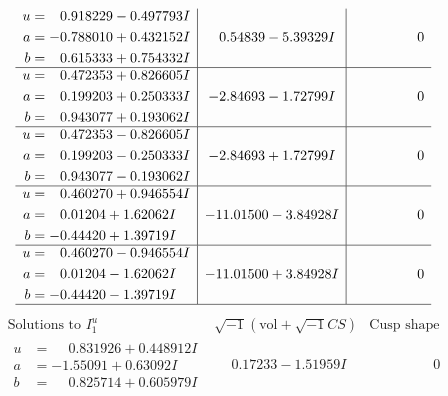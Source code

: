 \documentclass[1p]{elsarticle_modified}
\theoremstyle{definition}
\newcommand{\I}{\sqrt{-1}}
\begin{document}
$$\begin{array}{c|c|c}
\begin{aligned}
u &= \phantom{-}0.918229 - 0.497793 I \\
a &= -0.788010 + 0.432152 I \\
b &= \phantom{-}0.615333 + 0.754332 I\end{aligned}
 & \phantom{-}0.54839 - 5.39329 I & \phantom{-0.000000 } 0 \\ \hline\begin{aligned}
u &= \phantom{-}0.472353 + 0.826605 I \\
a &= \phantom{-}0.199203 + 0.250333 I \\
b &= \phantom{-}0.943077 + 0.193062 I\end{aligned}
 & -2.84693 - 1.72799 I & \phantom{-0.000000 } 0 \\ \hline\begin{aligned}
u &= \phantom{-}0.472353 - 0.826605 I \\
a &= \phantom{-}0.199203 - 0.250333 I \\
b &= \phantom{-}0.943077 - 0.193062 I\end{aligned}
 & -2.84693 + 1.72799 I & \phantom{-0.000000 } 0 \\ \hline\begin{aligned}
u &= \phantom{-}0.460270 + 0.946554 I \\
a &= \phantom{-}0.01204 + 1.62062 I \\
b &= -0.44420 + 1.39719 I\end{aligned}
 & -11.01500 - 3.84928 I & \phantom{-0.000000 } 0 \\ \hline\begin{aligned}
u &= \phantom{-}0.460270 - 0.946554 I \\
a &= \phantom{-}0.01204 - 1.62062 I \\
b &= -0.44420 - 1.39719 I\end{aligned}
 & -11.01500 + 3.84928 I & \phantom{-0.000000 } 0\\
 \hline 
 \end{array}$$\newpage$$\begin{array}{c|c|c}  
\text{Solutions to }I^u_{1}& \I (\text{vol} + \sqrt{-1}CS) & \text{Cusp shape}\\
 \hline 
\begin{aligned}
u &= \phantom{-}0.831926 + 0.448912 I \\
a &= -1.55091 + 0.63092 I \\
b &= \phantom{-}0.825714 + 0.605979 I\end{aligned}
 & \phantom{-}0.17233 - 1.51959 I & \phantom{-0.000000 } 0 \\ \hline\begin{aligned}

\end{aligned}
\end{array}$$
\end{document}
